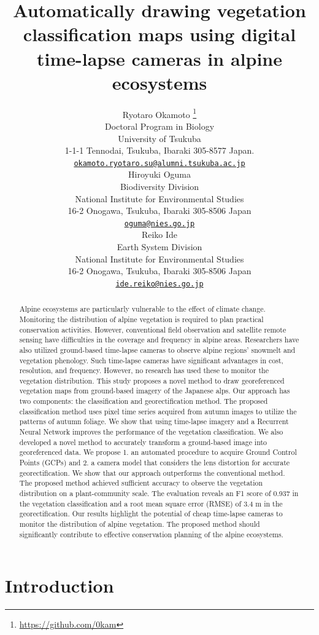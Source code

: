 \documentclass{article}
\title{Automatically drawing vegetation classification maps using digital time-lapse cameras in alpine ecosystems}
\author{
    Ryotaro Okamoto
    \thanks{\url{https://github.com/0kam}}
   \\
    Doctoral Program in Biology \\
    University of Tsukuba \\
  1-1-1 Tennodai, Tsukuba, Ibaraki 305-8577 Japan. \\
  \texttt{\href{mailto:okamoto.ryotaro.su@alumni.tsukuba.ac.jp}{\nolinkurl{okamoto.ryotaro.su@alumni.tsukuba.ac.jp}}} \\
   \And
    Hiroyuki Oguma
   \\
    Biodiversity Division \\
    National Institute for Environmental Studies \\
  16-2 Onogawa, Tsukuba, Ibaraki 305-8506 Japan \\
  \texttt{\href{mailto:oguma@nies.go.jp}{\nolinkurl{oguma@nies.go.jp}}} \\
   \And
    Reiko Ide
   \\
    Earth System Division \\
    National Institute for Environmental Studies \\
  16-2 Onogawa, Tsukuba, Ibaraki 305-8506 Japan \\
  \texttt{\href{mailto:ide.reiko@nies.go.jp}{\nolinkurl{ide.reiko@nies.go.jp}}} \\
  }
\begin{document}
\maketitle


\begin{abstract}
Alpine ecosystems are particularly vulnerable to the effect of climate change. Monitoring the distribution of alpine vegetation is required to plan practical conservation activities. However, conventional field observation and satellite remote sensing have difficulties in the coverage and frequency in alpine areas. Researchers have also utilized ground-based time-lapse cameras to observe alpine regions' snowmelt and vegetation phenology. Such time-lapse cameras have significant advantages in cost, resolution, and frequency. However, no research has used these to monitor the vegetation distribution. This study proposes a novel method to draw georeferenced vegetation maps from ground-based imagery of the Japanese alps. Our approach has two components: the classification and georectification method. The proposed classification method uses pixel time series acquired from autumn images to utilize the patterns of autumn foliage. We show that using time-lapse imagery and a Recurrent Neural Network improves the performance of the vegetation classification. We also developed a novel method to accurately transform a ground-based image into georeferenced data. We propose 1. an automated procedure to acquire Ground Control Points (GCPs) and 2. a camera model that considers the lens distortion for accurate georectification. We show that our approach outperforms the conventional method. The proposed method achieved sufficient accuracy to observe the vegetation distribution on a plant-community scale. The evaluation reveals an F1 score of 0.937 in the vegetation classification and a root mean square error (RMSE) of 3.4 m in the georectification. Our results highlight the potential of cheap time-lapse cameras to monitor the distribution of alpine vegetation. The proposed method should significantly contribute to effective conservation planning of the alpine ecosystems.
\end{abstract}


\hypertarget{introduction}{%
\section{Introduction}\label{introduction}}
\end{document}
